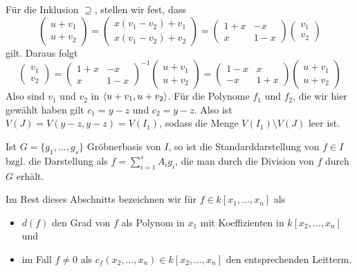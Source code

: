 \documentclass[11pt]{article}
\numberwithin{equation}{section}
\begin{document}
\begin{beispiel}
Für die Inklusion $\supseteq$, stellen wir fest, dass
\[
	\begin{pmatrix} 
			u + v_1 \\
			u + v_2 
	\end{pmatrix} 
	= 
	\begin{pmatrix}
			x (v_1 -v_2) + v_1
			\\ x (v_1 - v_2) + v_2 
	\end{pmatrix} 
	=
	\begin{pmatrix}
		1 + x &  -x 
			\\ x &  1 - x
	\end{pmatrix} 
	\begin{pmatrix} 
			v_1 \\ v_2
	\end{pmatrix} 
\] 
gilt. Daraus folgt 
\[
	\begin{pmatrix} 
		v_1 \\ v_2 
		\end{pmatrix} 
	= 	\begin{pmatrix}
		1+x  &  -x 
		\\ x &  1-x
	\end{pmatrix}^{-1} 	\begin{pmatrix} 
	u + v_1 \\
	u + v_2 
\end{pmatrix} 	
= \begin{pmatrix} 1-x & x \\ -x & 1 + x\end{pmatrix} \begin{pmatrix} 
	u + v_1 \\
	u + v_2 
\end{pmatrix} 	
\]
Also sind $v_1$ und $v_2$ in $\left< u+v_1, u+v_2 \right>$. 
Für die Polynome $f_1$ und $f_2$, die wir hier gewählt haben gilt $c_1 = y-z$ und $c_2 = y-z$. Also ist $V(J) = V(y-z,y-z) = V(I_1)$, sodass die Menge $V(I_1) \setminus V(J)$ leer ist.  
\end{beispiel} 


\begin{definition} 
	Ist $G = \{g_1,\ldots,g_s\}$ Gröbnerbasis von $I$, so ist die Standarddarstellung von $f \in I$ bzgl. die Darstellung als $f = \sum_{i=1}^s A_i g_i$, die man durch die Division von $f$ durch $G$ erhält. 
\end{definition} 

Im Rest dieses Abschnitts bezeichnen wir für $f \in k[x_1,\ldots,x_n]$ als 
\begin{itemize} 
	\item $d(f)$ den Grad von $f$ als Polynom in $x_1$ mit Koeffizienten in $k[x_2,\ldots,x_n]$ und 
	\item im Fall $f \ne 0$ als $c_f(x_2,\ldots,x_n) \in k[x_2,\ldots,x_n]$ den entsprechenden Leitterm. 
\end{itemize} 
\end{document}
